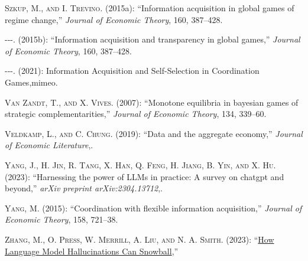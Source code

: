 \documentclass[
]{article}
\newlength{\cslhangindent}
\newlength{\cslentryspacingunit} %
\newenvironment{CSLReferences}[2] %
 {%
  \setlength{\parindent}{0pt}
  \ifodd #1
  \let\oldpar\par
  \def\par{\hangindent=\cslhangindent\oldpar}
  \fi
  \setlength{\parskip}{#2\cslentryspacingunit}
 }%
 {}
\theoremstyle{plain}
\theoremstyle{definition}
\theoremstyle{remark}
\begin{document}
\begin{CSLReferences}{1}{0}
\leavevmode{}%
\textsc{Szkup, M., and I. Trevino}. (2015a): {``Information acquisition
in global games of regime change,''} \emph{Journal of Economic Theory},
160, 387--428.

\leavevmode{}%
\textsc{-\/-\/-}. (2015b): {``Information acquisition and transparency
in global games,''} \emph{Journal of Economic Theory}, 160, 387--428.

\leavevmode{}%
\textsc{-\/-\/-}. (2021): Information Acquisition and Self-Selection in
Coordination Games,mimeo.

\leavevmode{}%
\textsc{Van Zandt, T., and X. Vives}. (2007): {``Monotone equilibria in
bayesian games of strategic complementarities,''} \emph{Journal of
Economic Theory}, 134, 339--60.

\leavevmode{}%
\textsc{Veldkamp, L., and C. Chung}. (2019): {``Data and the aggregate
economy,''} \emph{Journal of Economic Literature},.

\leavevmode{}%
\textsc{Yang, J., H. Jin, R. Tang, X. Han, Q. Feng, H. Jiang, B. Yin,
and X. Hu}. (2023): {``Harnessing the power of LLMs in practice: A
survey on chatgpt and beyond,''} \emph{arXiv preprint
arXiv:2304.13712},.

\leavevmode{}%
\textsc{Yang, M.} (2015): {``Coordination with flexible information
acquisition,''} \emph{Journal of Economic Theory}, 158, 721--38.

\leavevmode{}%
\textsc{Zhang, M., O. Press, W. Merrill, A. Liu, and N. A. Smith}.
(2023): {``\href{https://arxiv.org/abs/2305.13534}{How Language Model
Hallucinations Can Snowball},''}

\end{CSLReferences}
\end{document}

